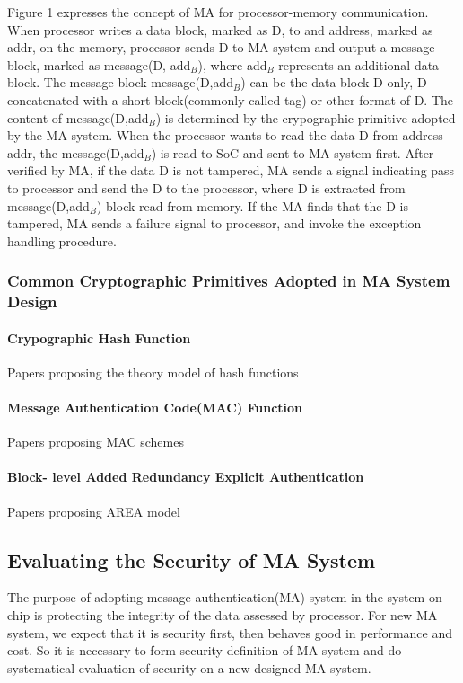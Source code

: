 \documentclass{article}
\begin{document}
Figure 1 expresses the concept of MA for processor-memory communication. 
When processor writes a data block, marked as D, to and address, marked as addr, on the memory, processor sends D to MA system and output a message block, marked as message(D, add$_B$), where add$_B$ represents an additional data block. The message block message(D,add$_B$) can be the data block D only, D concatenated with a short block(commonly called tag) or other format of D. The content of message(D,add$_B$) is determined by the crypographic primitive adopted by the MA system.
When the processor wants to read the data D from address addr, the message(D,add$_B$) is read to SoC and sent to MA system first. After verified by MA, if the data D is not tampered, MA sends a signal indicating pass to processor and send the D to the processor, where D is extracted from message(D,add$_B$) block read from memory.
If the MA finds that the D is tampered, MA sends a failure signal to processor, and invoke the exception handling procedure.

\subsubsection{Common Cryptographic Primitives Adopted in MA System Design}
\paragraph{Crypographic Hash Function}
Papers proposing the theory model of hash functions
\paragraph{Message Authentication Code(MAC) Function}
Papers proposing MAC schemes
\paragraph{Block- level Added Redundancy Explicit Authentication}
Papers proposing AREA model

\subsection{Evaluating the Security of MA System}
The purpose of adopting message authentication(MA) system in the system-on-chip is protecting the integrity of the data assessed by processor. 
For new MA system, we expect that it is security first, then behaves good in performance and cost. So it is necessary to form security definition of MA system and do systematical evaluation of security on a new designed MA system.
\end{document}
